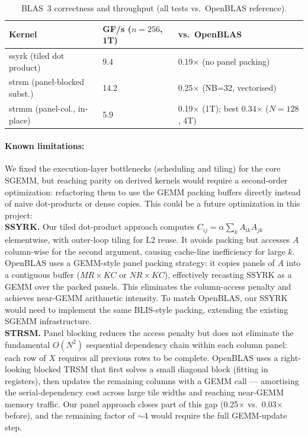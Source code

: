 \documentclass[11pt,a4paper]{article}
\begin{document}
\begin{table}[h]
\centering
\caption{BLAS~3 correctness and throughput (all tests vs.\ OpenBLAS reference).}
\small
\begin{tabular}{lll}
\toprule
Kernel & GF/s ($n=256$, 1T) & vs.\ OpenBLAS\\
\midrule
ssyrk (tiled dot product)    &  9.4 & 0.19$\times$ (no panel packing)\\
strsm (panel-blocked subst.) & 14.2 & 0.25$\times$ (NB=32, vectorised)\\
strmm (panel-col., in-place) &  5.9 & 0.19$\times$ (1T); best 0.34$\times$ ($N=128$, 4T)\\
\bottomrule
\end{tabular}
\end{table}

\paragraph{Known limitations:}
We fixed the execution-layer bottlenecks (scheduling and tiling) for the core SGEMM, but reaching parity on derived kernels would require a second-order optimization: refactoring them to use the GEMM packing buffers directly instead of naive dot-products or dense copies. This could be a future optimization in this project:\\

\textbf{SSYRK.}
Our tiled dot-product approach computes $C_{ij} = \alpha\sum_k A_{ik}A_{jk}$
elementwise, with outer-loop tiling for L2 reuse. It avoids packing but
accesses $A$ column-wise for the second argument, causing cache-line
inefficiency for large $k$. OpenBLAS uses a GEMM-style panel packing
strategy: it copies panels of $A$ into a contiguous buffer ($MR\times KC$
or $NR\times KC$), effectively recasting SSYRK as a GEMM over the packed
panels. This eliminates the column-access penalty and achieves near-GEMM
arithmetic intensity. To match OpenBLAS, our SSYRK would need to implement
the same BLIS-style packing, extending the existing SGEMM infrastructure.\\

\textbf{STRSM.}
Panel blocking reduces the access penalty but does not eliminate the fundamental
$O(N^2)$ sequential dependency chain within each column panel: each row of $X$
requires all previous rows to be complete. OpenBLAS uses a right-looking blocked TRSM
that first solves a small diagonal block (fitting in registers), then updates the remaining
columns with a GEMM call — amortising the serial-dependency cost across large tile widths
and reaching near-GEMM memory traffic. Our panel approach closes part of this gap
(0.25$\times$ vs.\ 0.03$\times$ before), and the remaining factor of $\sim$4 would require
the full GEMM-update step.\\
\end{document}
